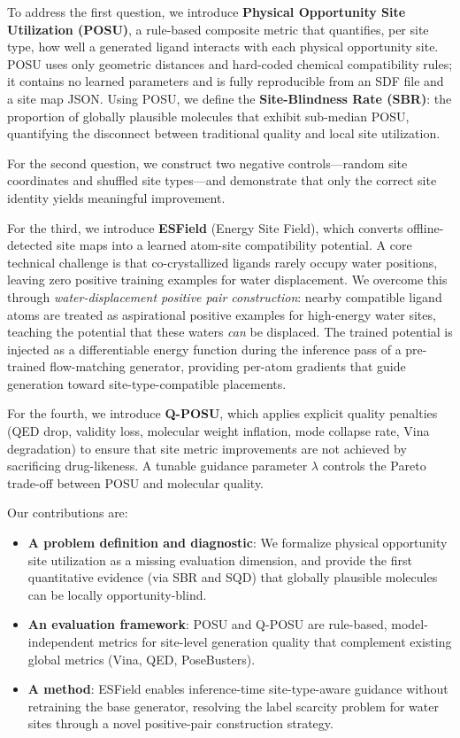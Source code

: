 \documentclass[journal=jcisd,manuscript=article]{achemso}
\begin{document}
To address the first question, we introduce \textbf{Physical Opportunity Site
Utilization (POSU)}, a rule-based composite metric that quantifies, per site type,
how well a generated ligand interacts with each physical opportunity site. POSU
uses only geometric distances and hard-coded chemical compatibility rules; it
contains no learned parameters and is fully reproducible from an SDF file and
a site map JSON. Using POSU, we define the \textbf{Site-Blindness Rate (SBR)}:
the proportion of globally plausible molecules that exhibit sub-median POSU,
quantifying the disconnect between traditional quality and local site utilization.

For the second question, we construct two negative controls---random site
coordinates and shuffled site types---and demonstrate that only the correct
site identity yields meaningful improvement.

For the third, we introduce \textbf{ESField} (Energy Site Field), which converts
offline-detected site maps into a learned atom-site compatibility potential.
A core technical challenge is that co-crystallized ligands rarely occupy water
positions, leaving zero positive training examples for water displacement. We
overcome this through \emph{water-displacement positive pair construction}:
nearby compatible ligand atoms are treated as aspirational positive examples
for high-energy water sites, teaching the potential that these waters \emph{can}
be displaced. The trained potential is injected as a differentiable energy
function during the inference pass of a pre-trained flow-matching generator,
providing per-atom gradients that guide generation toward site-type-compatible
placements.

For the fourth, we introduce \textbf{Q-POSU}, which applies explicit quality
penalties (QED drop, validity loss, molecular weight inflation, mode collapse
rate, Vina degradation) to ensure that site metric improvements are not achieved
by sacrificing drug-likeness. A tunable guidance parameter $\lambda$ controls
the Pareto trade-off between POSU and molecular quality.

Our contributions are:
\begin{itemize}
    \item \textbf{A problem definition and diagnostic}: We formalize physical
          opportunity site utilization as a missing evaluation dimension, and
          provide the first quantitative evidence (via SBR and SQD) that
          globally plausible molecules can be locally opportunity-blind.
    \item \textbf{An evaluation framework}: POSU and Q-POSU are rule-based,
          model-independent metrics for site-level generation quality that
          complement existing global metrics (Vina, QED, PoseBusters).
    \item \textbf{A method}: ESField enables inference-time site-type-aware
          guidance without retraining the base generator, resolving the label
          scarcity problem for water sites through a novel positive-pair
          construction strategy.
\end{itemize}
\end{document}
